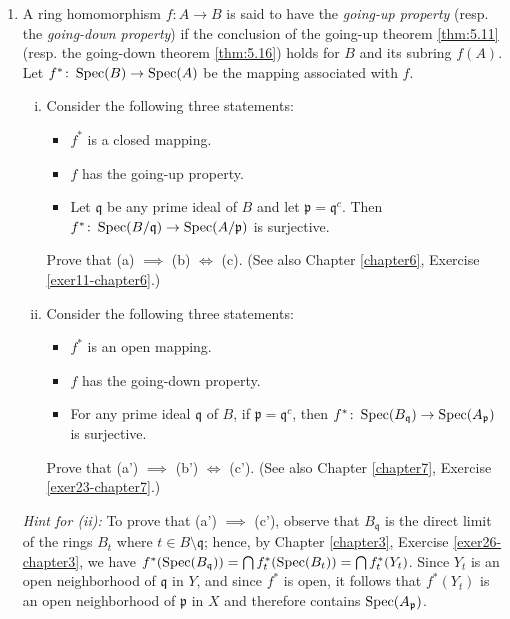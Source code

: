 \begin{enumerate}
    \item \label{exer10-chapter5} A ring homomorphism $f \colon A \to B$ is said to have the \emph{going-up property} (resp. the \emph{going-down property}) if the conclusion of the going-up theorem \eqref{thm:5.11} (resp. the going-down theorem \eqref{thm:5.16}) holds for $B$ and its subring $f(A)$.\\
    Let $f^* \colon \operatorname{Spec}(B) \to \operatorname{Spec}(A)$ be the mapping associated with $f$.
    \begin{enumerate}[i)]
        \item Consider the following three statements:
        \begin{itemize}
            \item[(a)] $f^*$ is a closed mapping.
            \item[(b)] $f$ has the going-up property.
            \item[(c)] Let $\mathfrak{q}$ be any prime ideal of $B$ and let $\mathfrak{p} = \mathfrak{q}^c$. Then $f^* \colon \operatorname{Spec}(B/\mathfrak{q}) \to \operatorname{Spec}(A/\mathfrak{p})$ is surjective.
        \end{itemize}
        Prove that (a) $\implies$ (b) $\iff$ (c). (See also Chapter \ref{chapter6}, Exercise \ref{exer11-chapter6}.)
        \item Consider the following three statements:
        \begin{itemize}
            \item[(a')] $f^*$ is an open mapping.
            \item[(b')] $f$ has the going-down property.
            \item[(c')] For any prime ideal $\mathfrak{q}$ of $B$, if $\mathfrak{p} = \mathfrak{q}^c$, then $f^* \colon \operatorname{Spec}(B_{\mathfrak{q}}) \to \operatorname{Spec}(A_{\mathfrak{p}})$ is surjective.
        \end{itemize}
        Prove that (a') $\implies$ (b') $\iff$ (c'). (See also Chapter \ref{chapter7}, Exercise \ref{exer23-chapter7}.)
    \end{enumerate}
    \textit{Hint for (ii):} To prove that (a') $\implies$ (c'), observe that $B_{\mathfrak{q}}$ is the direct limit of the rings $B_t$ where $t \in B \setminus \mathfrak{q}$; hence, by Chapter \ref{chapter3}, Exercise \ref{exer26-chapter3}, we have $f^*(\operatorname{Spec}(B_{\mathfrak{q}})) = \bigcap f_t^*(\operatorname{Spec}(B_t)) = \bigcap f_t^*(Y_t)$. Since $Y_t$ is an open neighborhood of $\mathfrak{q}$ in $Y$, and since $f^*$ is open, it follows that $f^*(Y_t)$ is an open neighborhood of $\mathfrak{p}$ in $X$ and therefore contains $\operatorname{Spec}(A_{\mathfrak{p}})$.


\end{enumerate}
